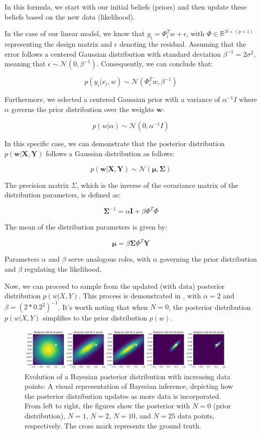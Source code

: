 In this formula, we start with our initial beliefs (priors) and then update these beliefs based on the new data (likelihood).

In the case of our linear model, we know that $ y_i = \Phi^T_i w + \epsilon $, with $ \Phi \in \mathbb{R}^{N \times (p + 1)} $ representing the design matrix and $ \epsilon $ denoting the residual. Assuming that the error follows a centered Gaussian distribution with standard deviation $ \beta ^{-1} = 2\sigma^2 $, meaning that $ \epsilon \sim \mathcal{N}(0, \beta ^{-1}) $. Consequently, we can conclude that:

\[ p(y_i | x_i, w) \sim \mathcal{N}(\Phi^T_i w, \beta ^{-1}) \]

Furthermore, we selected a centered Gaussian prior with a variance of $ \alpha^{-1}I $ where$\alpha$ governs the prior distribution over the weights $\mathbf{w}$:

\[ p(w | \alpha) \sim \mathcal{N}(0, \alpha^{-1}I) \]

In this specific case, we can demonstrate that the posterior distribution $ p(\mathbf{w}|\mathbf{X}, \mathbf{Y}) $ follows a Gaussian distribution as follows:

\[ p(\mathbf{w}|\mathbf{X}, \mathbf{Y}) \sim \mathcal{N}(\boldsymbol{\mu}, \boldsymbol{\Sigma}) \]

The precision matrix $ \Sigma $, which is the inverse of the covariance matrix of the distribution parameters, is defined as:

\[ \boldsymbol{\Sigma}^{-1} = \alpha \mathbf{I} + \beta \Phi^T \Phi \]

The mean of the distribution parameters is given by:

\[ \boldsymbol{\mu} = \beta \boldsymbol{\Sigma} \Phi^T \mathbf{Y} \]

Parameters $\alpha$ and $\beta$ serve analogous roles, with $\alpha$ governing the prior distribution and $\beta$ regulating the likelihood.

Now, we can proceed to sample from the updated (with data) posterior distribution $p(w | X, Y)$. This process is demonstrated in , with $\alpha = 2$ and $\beta = (2 * 0.2^2)^{-1}$. It's worth noting that when $N=0$, the posterior distribution $p(w|X,Y)$ simplifies to the prior distribution $p(w)$.

\begin{figure}[H]
    \centering
    \includegraphics[width=0.95\textwidth]{posterior.pdf}
    \caption{Evolution of a Bayesian posterior distribution with increasing data points: A visual representation of Bayesian inference, depicting how the posterior distribution updates as more data is incorporated. From left to right, the figures show the posterior with $N=0$ (prior distribution), $N=1$, $N=2$, $N=10$, and $N=25$ data points, respectively. The cross mark represents the ground truth.}
    \label{fig:posterior}
\end{figure}

